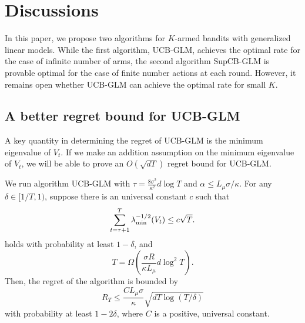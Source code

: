 \section{Discussions}
\label{sec:discussions}

In this paper, we propose two algorithms for $K$-armed bandits with generalized linear models. While the first algorithm, UCB-GLM, achieves the optimal rate for the case of infinite number of arms, the second algorithm SupCB-GLM is provable optimal for the case of finite number actions at each round. However, it remains open whether UCB-GLM can achieve the optimal rate for small $K$.

\subsection{A better regret bound for UCB-GLM}

A key quantity in determining the regret of UCB-GLM is the minimum eigenvalue of $V_t$. If we make an addition assumption on the minimum eigenvalue of $V_t$, we will be able to prove an $O(\sqrt{dT})$ regret bound for UCB-GLM.

\begin{theorem} \label{thm:maindis}
We run algorithm UCB-GLM with $\tau=\frac{8\sigma^2}{\kappa^2}d\log T$ and $\alpha \le L_{\mu} \sigma/\kappa$. For any $\delta \in [1/T,1)$, suppose there is an universal constant $c$ such that
\begin{equation} \label{eq:assump4}
\sum_{t=\tau+1}^{T} \lambda_{\min}^{-1/2}(V_t) \le  c \sqrt{T}.
\end{equation}
holds with probability at least $1-\delta$, and 
\begin{equation} \label{eq:condition1}
T=\Omega \left(\frac{\sigma R}{ \kappa L_{\mu} } d \log^2 T \right).
\end{equation}
Then, the regret of the algorithm is bounded by
\begin{equation*}
R_T \le \frac{C L_{\mu} \sigma}{\kappa} \sqrt{dT\log(T/\delta)}
\end{equation*}
with probability at least $1-2\delta$, where $C$ is a positive, universal constant. \end{theorem}

